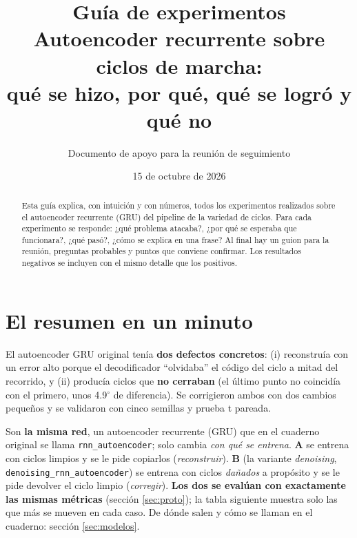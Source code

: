 \documentclass[11pt,a4paper]{article}
\title{\textbf{\color{azul}Guía de experimentos}\\[2pt]\large Autoencoder recurrente sobre ciclos de marcha:\\ qué se hizo, por qué, qué se logró y qué no}
\author{Documento de apoyo para la reunión de seguimiento}
\date{15 de octubre de 2026}
\newcommand{\gr}{$^\circ$}
\begin{document}
\maketitle
\thispagestyle{fancy}

\begin{abstract}\noindent
Esta guía explica, con intuición y con números, todos los experimentos realizados sobre el autoencoder recurrente (GRU) del pipeline de la variedad de ciclos. Para cada experimento se responde: ¿qué problema atacaba?, ¿por qué se esperaba que funcionara?, ¿qué pasó?, ¿cómo se explica en una frase? Al final hay un guion para la reunión, preguntas probables y puntos que conviene confirmar. Los resultados negativos se incluyen con el mismo detalle que los positivos.
\end{abstract}

\setcounter{tocdepth}{1}
{\small\setlength{\parskip}{0pt}\tableofcontents}
\newpage

\section{El resumen en un minuto}

\begin{resultado}
El autoencoder GRU original tenía \textbf{dos defectos concretos}: (i) reconstruía con un error alto porque el decodificador ``olvidaba'' el código del ciclo a mitad del recorrido, y (ii) producía ciclos que \textbf{no cerraban} (el último punto no coincidía con el primero, unos 4.9\gr{} de diferencia). Se corrigieron ambos con dos cambios pequeños y se validaron con cinco semillas y prueba t pareada.
\end{resultado}

\begin{intuicion}
Son \textbf{la misma red}, un autoencoder recurrente (GRU) que en el cuaderno original se llama \texttt{rnn\_autoencoder}; solo cambia \emph{con qué se entrena}.
\textbf{A} se entrena con ciclos limpios y se le pide copiarlos (\emph{reconstruir}). \textbf{B} (la variante \emph{denoising}, \texttt{denoising\_rnn\_autoencoder}) se entrena con ciclos \emph{dañados} a propósito y se le pide devolver el ciclo limpio (\emph{corregir}).
\textbf{Los dos se evalúan con exactamente las mismas métricas} (sección \ref{sec:proto}); la tabla siguiente muestra solo las que más se mueven en cada caso. De dónde salen y cómo se llaman en el cuaderno: sección \ref{sec:modelos}.
\end{intuicion}
\end{document}
